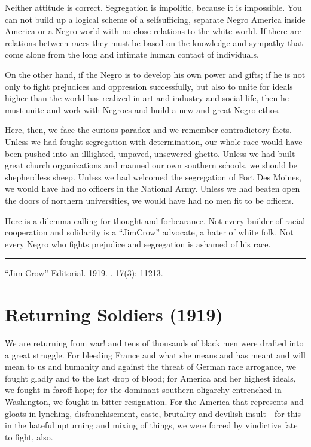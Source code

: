 \documentclass[letterpaper,10pt,english]{jupyterBook}
\begin{document}
\sphinxAtStartPar
Neither attitude is correct. Segregation is impolitic, because it is impossible. You can not build up a logical scheme of a self\sphinxhyphen{}sufficing, sep­arate Negro America inside America or a Negro world with no close rela­tions to the white world. If there are relations between races they must be based on the knowledge and sym­pathy that come alone from the long and intimate human contact of indi­viduals.

\sphinxAtStartPar
On the other hand, if the Negro is to develop his own power and gifts; if he is not only to fight prejudices and oppression successfully, but also to unite for ideals higher than the world has realized in art and indus­try and social life, then he must unite and work with Negroes and build a new and great Negro ethos.

\sphinxAtStartPar
Here, then, we face the curious paradox and we remember contradictory facts. Unless we had fought segregation with determination, our whole race would have been pushed into an ill\sphinxhyphen{}lighted, unpaved, un\sphinxhyphen{}sewered ghetto. Unless we had built great church organizations and manned our own southern schools, we should be shepherdless sheep. Unless we had welcomed the segregation of Fort Des Moines, we would have had no officers in the National Army. Unless we had beaten open the doors of northern universities, we would have had no men fit to be officers.

\sphinxAtStartPar
Here is a dilemma calling for thought and forbearance. Not every builder of racial co\sphinxhyphen{}operation and solidarity is a “Jim\sphinxhyphen{}Crow” advocate, a hater of white folk. Not every Negro who fights prejudice and segregation is ashamed of his race.


\bigskip\hrule\bigskip


\sphinxAtStartPar
{} “Jim Crow” Editorial. 1919. . 17(3): 112\sphinxhyphen{}13.


\section{Returning Soldiers (1919)}
\label{\detokenize{Volumes/18/01/returning_soldiers:returning-soldiers-1919}}\label{\detokenize{Volumes/18/01/returning_soldiers::doc}}
\sphinxAtStartPar
We are returning from war!  and tens of thousands of black men were drafted into a great struggle. For bleeding France and what she means and has meant and will mean to us and humanity and against the threat of German race arrogance, we fought gladly and to the last drop of blood; for America and her highest ideals, we fought in far\sphinxhyphen{}off hope; for the dominant southern oligarchy entrenched in Washington, we fought in bitter resignation. For the America that represents and gloats in lynching, disfranchisement, caste, brutality and devilish insult—for this in the hateful upturning and mixing of things, we were forced by vindictive fate to fight, also.
\end{document}

